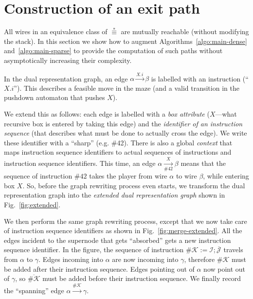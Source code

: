 \documentclass[a4paper,UKenglish,cleveref, autoref]{lipics-v2021}
\begin{document}
\section{Construction of an exit path}
\label{sec:arg}

All wires in an equivalence class of $\stackrel{*}{\equiv}$ are mutually
reachable (without modifying the stack). In this section we show how to augment
Algorithms~\ref{algo:main-dense} and~\ref{algo:main-sparse} to provide the
computation of such paths without asymptotically increasing their complexity.

In the dual representation graph, an edge $\alpha \xrightarrow{X.i} \beta$ is
labelled with an instruction (``$X.i$''). This describes a feasible move in the
maze (and a valid transition in the pushdown automaton that pushes $X$).

We extend this as follows: each edge is labelled with a \emph{box attribute}
($X$---what recursive box is entered by taking this edge) and the
\emph{identifier of an instruction sequence} (that describes what must be done
to actually cross the edge). We write these identifier with a ``sharp''
(e.g. \#42). There is also a global \emph{context} that maps instruction
sequence identifiers to actual sequences of instructions and instruction
sequence identifiers. This time, an edge $\alpha \xrightarrow[\#42]{X} \beta$
means that the sequence of instruction $\#42$ takes the player from wire
$\alpha$ to wire $\beta$, while entering box $X$. So, before the graph rewriting
process even starts, we transform the dual representation graph into the
\emph{extended dual representation graph} shown in Fig.~\ref{fig:extended}.

We then perform the same graph rewriting process, except that we now take care
of instruction sequence identifiers as shown in
Fig.~\ref{fig:merge-extended}. All the edges incident to the supernode that gets
``absorbed'' gets a new instruction sequence identifier. In the figure, the
sequence of instruction $\# \mathcal{K} := \mathcal{I} ; \overline{\mathcal{J}}$
travels from $\alpha$ to $\gamma$. Edges incoming into $\alpha$ are now incoming
into $\gamma$, therefore $\# \mathcal{K}$ must be added after their instruction
sequence. Edges pointing out of $\alpha$ now point out of $\gamma$, so
$\overline{\# \mathcal{K}}$ must be added before their instruction sequence. We
finally record the ``spanning'' edge
$\alpha \xrightarrow{\# \mathcal{K}} \gamma$.
\end{document}
